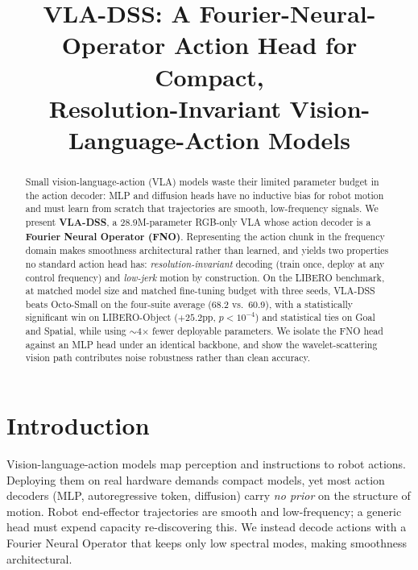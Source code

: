 \documentclass[conference]{IEEEtran}
\title{VLA-DSS: A Fourier-Neural-Operator Action Head for Compact,\\
Resolution-Invariant Vision-Language-Action Models}
\author{\IEEEauthorblockN{Anonymous Submission}}
\begin{document}
\maketitle

\begin{abstract}
Small vision-language-action (VLA) models waste their limited parameter budget in
the action decoder: MLP and diffusion heads have no inductive bias for robot motion
and must learn from scratch that trajectories are smooth, low-frequency signals. We
present \textbf{VLA-DSS}, a 28.9M-parameter RGB-only VLA whose action decoder is a
\textbf{Fourier Neural Operator (FNO)}. Representing the action chunk in the frequency
domain makes smoothness architectural rather than learned, and yields two properties
no standard action head has: \emph{resolution-invariant} decoding (train once, deploy
at any control frequency) and \emph{low-jerk} motion by construction. On the LIBERO
benchmark, at matched model size and matched fine-tuning budget with three seeds,
VLA-DSS beats Octo-Small on the four-suite average (68.2 vs.\ 60.9), with a
statistically significant win on LIBERO-Object ($+25.2$pp, $p<10^{-4}$) and
statistical ties on Goal and Spatial, while using $\sim$4$\times$ fewer deployable
parameters. We isolate the FNO head against an MLP head under an identical backbone,
and show the wavelet-scattering vision path contributes noise robustness rather than
clean accuracy.
\end{abstract}

\section{Introduction}
Vision-language-action models map perception and instructions to robot actions.
Deploying them on real hardware demands compact models, yet most action decoders
(MLP, autoregressive token, diffusion) carry \emph{no prior} on the structure of
motion. Robot end-effector trajectories are smooth and low-frequency; a generic head
must expend capacity re-discovering this. We instead decode actions with a Fourier
Neural Operator that keeps only low spectral modes, making smoothness architectural.
\end{document}
